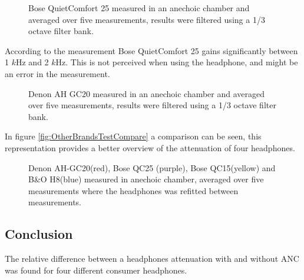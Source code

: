 \begin{figure}[H]
	\centering
	
	\caption{Bose QuietComfort 25 measured in an anechoic chamber and averaged over five measurements, results were filtered using a 1/3 octave filter bank.}
	\label{fig:QC25Comp}
\end{figure}
According to the measurement Bose QuietComfort 25 gains significantly between 1 $k$Hz and 2 $k$Hz. This is not perceived when using the headphone, and might be an error in the measurement. 

\begin{figure}[H]
	\centering
	
	\caption{Denon AH GC20 measured in an anechoic chamber and averaged over five measurements, results were filtered using a 1/3 octave filter bank.}
	\label{fig:DenonComp}
\end{figure}

In figure \autoref{fig:OtherBrandsTestCompare} a comparison can be seen, this representation provides a better overview of the attenuation of four headphones.
\begin{figure}[H]
	\centering
	
	\caption{Denon AH-GC20(red), Bose QC25 (purple), Bose QC15(yellow) and B\&O H8(blue) measured in anechoic chamber, averaged over five measurements where the headphones was refitted between measurements.}
	\label{fig:OtherBrandsTestCompare}
\end{figure}


%	


\subsection{Conclusion}
The relative difference between a headphones attenuation with and without ANC was found for four different consumer headphones.



